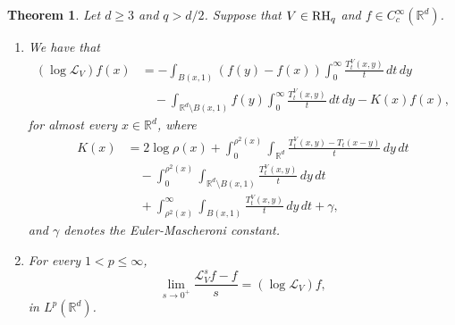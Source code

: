 \documentclass[10pt, a4paper, reqno]{amsart}
\newtheorem{thm}{Theorem}[section]
\theoremstyle{definition}
\theoremstyle{remark}
\newcommand{\RH}{\textup{RH}}
\numberwithin{equation}{section}
\begin{document}
\begin{thm}\label{thm: 1.2} 
    Let $d \geq 3$ and $q > d/2$. Suppose that $V \in \RH_q$ and $f \in C^\infty_c(\mathbb{R}^d)$. 
    \begin{enumerate}
        \item \label{item: teo 1.2 - a} We have that
        \begin{equation}\label{eq: teo 1.2}
        \begin{split}
            (\log\mathcal{L}_V)f(x) & = -\int_{B(x,1)} (f(y)-f(x)) \int_0^\infty \frac{T_t^V(x,y)}{t} \, dt \, dy \\
            & \quad - \int_{\mathbb{R}^d \setminus B(x,1)} f(y) \int_0^\infty \frac{T_t^V(x,y)}{t} \, dt \, dy - K(x)f(x),
        \end{split}
        \end{equation}
        for almost every $x \in \mathbb{R}^d$, where
        \begin{equation*}
        \begin{split}
            K(x) & = 2 \log \rho(x) + \int_0^{\rho^2(x)} \int_{\mathbb{R}^d} \frac{T_t^V(x,y) - T_t(x-y)}{t} \, dy \, dt \\
            & \quad - \int_0^{\rho^2(x)} \int_{\mathbb{R}^d \setminus B(x,1)} \frac{T_t^V(x,y)}{t} \, dy \, dt \\
            & \quad + \int_{\rho^2(x)}^\infty \int_{B(x,1)} \frac{T_t^V(x,y)}{t} \, dy \, dt +\gamma,
        \end{split}
        \end{equation*}
        and $\gamma$ denotes the Euler-Mascheroni constant.

        \item \label{item: teo 1.2 - b} For every $1 < p \leq \infty$,
        \begin{equation*}
            \lim_{s \rightarrow 0^{+}} \frac{\mathcal{L}_V^s f - f}{s} = (\log \mathcal{L}_V) f, 
        \end{equation*}
        in $L^p(\mathbb{R}^d)$.
    \end{enumerate}
\end{thm}
\end{document}
